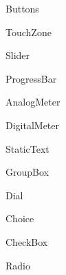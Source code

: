 Buttons\par
 Touch\-Zone\par
 Slider\par
 Progress\-Bar\par
 Analog\-Meter\par
 Digital\-Meter\par
 Static\-Text\par
 Group\-Box\par
 Dial\par
 Choice\par
 Check\-Box\par
 Radio\par
 